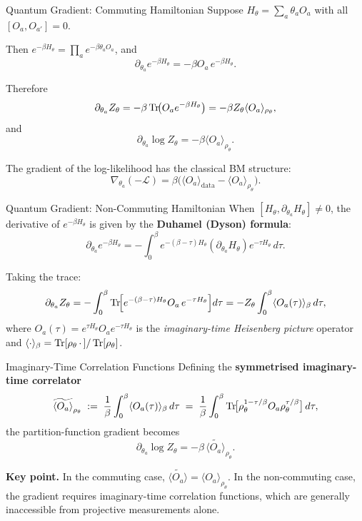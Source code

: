 \documentclass[aspectratio=169]{beamer}
\newcommand{\Zth}{Z_\theta}
\begin{document}
\begin{frame}{Quantum Gradient: Commuting Hamiltonian}
Suppose $H_\theta = \sum_a \theta_a O_a$ with all $[O_a, O_{a'}]=0$.

\medskip
Then $e^{-\beta H_\theta} = \prod_a e^{-\beta\theta_a O_a}$, and
\[
  \partial_{\theta_a}e^{-\beta H_\theta}
  = -\beta O_a\, e^{-\beta H_\theta}.
\]

Therefore
\[
  \partial_{\theta_a}\Zth
  = -\beta\Tr\!\bigl(O_a e^{-\beta H_\theta}\bigr)
  = -\beta\Zth\langle O_a\rangle_{\rho_\theta},
\]
and
\[
  \partial_{\theta_a}\log\Zth = -\beta\langle O_a\rangle_{\rho_\theta}.
\]

The gradient of the log-likelihood has the classical BM structure:
\[
  \nabla_{\theta_a}(-\mathcal{L})
  = \beta\bigl(\langle O_a\rangle_{\mathrm{data}}
               - \langle O_a\rangle_{\rho_\theta}\bigr).
\]
\end{frame}

\begin{frame}{Quantum Gradient: Non-Commuting Hamiltonian}
When $[H_\theta, \partial_{\theta_a}H_\theta]\ne 0$, the derivative of
$e^{-\beta H_\theta}$ is given by the \textbf{Duhamel (Dyson) formula}:
\[
  \partial_{\theta_a}e^{-\beta H_\theta}
  =
  -\int_0^\beta
    e^{-(\beta-\tau)H_\theta}
    (\partial_{\theta_a}H_\theta)
    e^{-\tau H_\theta}
  \,d\tau.
\]

Taking the trace:
\[
  \partial_{\theta_a}\Zth
  =
  -\int_0^\beta
    \Tr\!\Bigl[
      e^{-(\beta-\tau)H_\theta}
      O_a\,
      e^{-\tau H_\theta}
    \Bigr]
  d\tau
  =
  -\Zth
  \int_0^\beta
    \langle O_a(\tau)\rangle_\beta
  \,d\tau,
\]
where $O_a(\tau) = e^{\tau H_\theta}O_a e^{-\tau H_\theta}$ is the
\emph{imaginary-time Heisenberg picture} operator and
$\langle\cdot\rangle_\beta = \Tr[\rho_\theta\,\cdot\,]/\Tr[\rho_\theta]$.
\end{frame}

\begin{frame}{Imaginary-Time Correlation Functions}
Defining the \textbf{symmetrised imaginary-time correlator}
\[
  \widetilde{\langle O_a\rangle}_{\rho_\theta}
  \;:=\;
  \frac{1}{\beta}\int_0^\beta
    \langle O_a(\tau)\rangle_\beta
  \,d\tau
  \;=\;
  \frac{1}{\beta}
  \int_0^\beta
    \Tr\!\bigl[\rho_\theta^{1-\tau/\beta} O_a \rho_\theta^{\tau/\beta}\bigr]
  \,d\tau,
\]
the partition-function gradient becomes
\[
  \partial_{\theta_a}\log\Zth
  = -\beta\,\widetilde{\langle O_a\rangle}_{\rho_\theta}.
\]

\textbf{Key point.} In the commuting case,
$\widetilde{\langle O_a\rangle} = \langle O_a\rangle_{\rho_\theta}$.
In the non-commuting case, the gradient requires imaginary-time
correlation functions, which are generally inaccessible from projective
measurements alone.
\end{frame}
\end{document}

